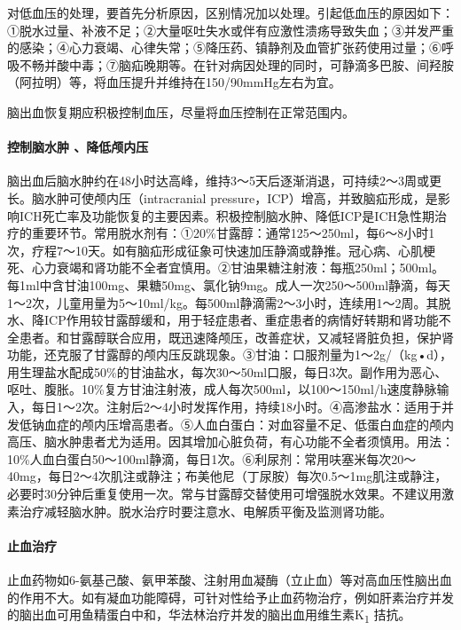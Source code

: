 对低血压的处理，要首先分析原因，区别情况加以处理。引起低血压的原因如下：①脱水过量、补液不足；②大量呕吐失水或伴有应激性溃疡导致失血；③并发严重的感染；④心力衰竭、心律失常；⑤降压药、镇静剂及血管扩张药使用过量；⑥呼吸不畅并酸中毒；⑦脑疝晚期等。在针对病因处理的同时，可静滴多巴胺、间羟胺（阿拉明）等，将血压提升并维持在150/90mmHg左右为宜。

脑出血恢复期应积极控制血压，尽量将血压控制在正常范围内。

\paragraph{控制脑水肿 、降低颅内压}

脑出血后脑水肿约在48小时达高峰，维持3～5天后逐渐消退，可持续2～3周或更长。脑水肿可使颅内压（intracranial
pressure，ICP）增高，并致脑疝形成，是影响ICH死亡率及功能恢复的主要因素。积极控制脑水肿、降低ICP是ICH急性期治疗的重要环节。常用脱水剂有：①20\%甘露醇：通常125～250ml，每6～8小时1次，疗程7～10天。如有脑疝形成征象可快速加压静滴或静推。冠心病、心肌梗死、心力衰竭和肾功能不全者宜慎用。②甘油果糖注射液：每瓶250ml；500ml。每1ml中含甘油100mg、果糖50mg、氯化钠9mg。成人一次250～500ml静滴，每天1～2次，儿童用量为5～10ml/kg。每500ml静滴需2～3小时，连续用1～2周。其脱水、降ICP作用较甘露醇缓和，用于轻症患者、重症患者的病情好转期和肾功能不全患者。和甘露醇联合应用，既迅速降颅压，改善症状，又减轻肾脏负担，保护肾功能，还克服了甘露醇的颅内压反跳现象。③甘油：口服剂量为1～2g/（kg•d），用生理盐水配成50\%的甘油盐水，每次30～50ml口服，每日3次。副作用为恶心、呕吐、腹胀。10\%复方甘油注射液，成人每次500ml，以100～150ml/h速度静脉输入，每日1～2次。注射后2～4小时发挥作用，持续18小时。④高渗盐水：适用于并发低钠血症的颅内压增高患者。⑤人血白蛋白：对血容量不足、低蛋白血症的颅内高压、脑水肿患者尤为适用。因其增加心脏负荷，有心功能不全者须慎用。用法：10\%人血白蛋白50～100ml静滴，每日1次。⑥利尿剂：常用呋塞米每次20～40mg，每日2～4次肌注或静注；布美他尼（丁尿胺）每次0.5～1mg肌注或静注，必要时30分钟后重复使用一次。常与甘露醇交替使用可增强脱水效果。不建议用激素治疗减轻脑水肿。脱水治疗时要注意水、电解质平衡及监测肾功能。

\paragraph{止血治疗}

止血药物如6-氨基己酸、氨甲苯酸、注射用血凝酶（立止血）等对高血压性脑出血的作用不大。如有凝血功能障碍，可针对性给予止血药物治疗，例如肝素治疗并发的脑出血可用鱼精蛋白中和，华法林治疗并发的脑出血用维生素K\textsubscript{1}
拮抗。

